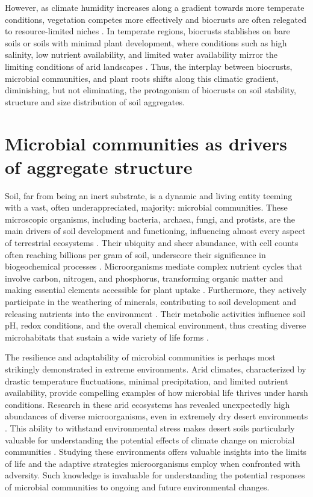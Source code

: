 However, as climate humidity increases along a gradient towards more temperate conditions, vegetation competes more effectively and biocrusts are often relegated to resource-limited niches \citep{Budel2016}. In temperate regions, biocrusts stablishes on bare soils or soils with minimal plant development, where conditions such as high salinity, low nutrient availability, and limited water availability mirror the limiting conditions of arid landscapes \citep{Corbin2020}. Thus, the interplay between biocrusts, microbial communities, and plant roots shifts along this climatic gradient, diminishing, but not eliminating, the protagonism of biocrusts on soil stability, structure and size distribution of soil aggregates.

\section{Microbial communities as drivers of aggregate structure}
\label{sec:MicrobialCommunitiesAggregateStructure}

Soil, far from being an inert substrate, is a dynamic and living entity teeming with a vast, often underappreciated, majority: microbial communities. These microscopic organisms, including bacteria, archaea, fungi, and protists, are the main drivers of soil development and functioning, influencing almost every aspect of terrestrial ecosystems \citep{Bardgett2014}. Their ubiquity and sheer abundance, with cell counts often reaching billions per gram of soil, underscore their significance in biogeochemical processes \citep{Nunan2001}. Microorganisms mediate complex nutrient cycles that involve carbon, nitrogen, and phosphorus, transforming organic matter and making essential elements accessible for plant uptake \citep{Schimel2012}. Furthermore, they actively participate in the weathering of minerals, contributing to soil development and releasing nutrients into the environment \citep{Barkay2001,Burford2003}. Their metabolic activities influence soil pH, redox conditions, and the overall chemical environment, thus creating diverse microhabitats that sustain a wide variety of life forms \citep{Brehm2005}.

The resilience and adaptability of microbial communities is perhaps most strikingly demonstrated in extreme environments. Arid climates, characterized by drastic temperature fluctuations, minimal precipitation, and limited nutrient availability, provide compelling examples of how microbial life thrives under harsh conditions. Research in these arid ecosystems has revealed unexpectedly high abundances of diverse microorganisms, even in extremely dry desert environments \citep{Bernhard2018,Newsham2016}. This ability to withstand environmental stress makes desert soils particularly valuable for understanding the potential effects of climate change on microbial communities \citep{Pearce2012}. Studying these environments offers valuable insights into the limits of life and the adaptive strategies microorganisms employ when confronted with adversity. Such knowledge is invaluable for understanding the potential responses of microbial communities to ongoing and future environmental changes.


